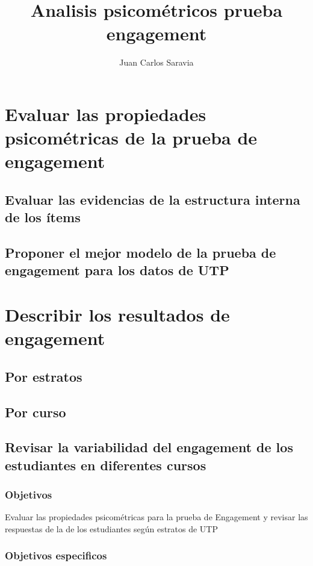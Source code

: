 \documentclass{beamer}
\title{Analisis psicométricos prueba engagement}
\author{Juan Carlos Saravia}
\begin{document}
\begin{frame}
\titlepage
\end{frame}


\section{Evaluar las propiedades psicométricas de la prueba de engagement}
\subsection{Evaluar las evidencias de la estructura interna de los ítems}
\subsection{Proponer el mejor modelo de la prueba de engagement para los datos de UTP}

\section{Describir los resultados de engagement}
\subsection{Por estratos}
\subsection{Por curso}
\subsection{Revisar la variabilidad del engagement de los estudiantes en diferentes cursos}


\begin{frame}
\frametitle{Objetivos}
Evaluar las propiedades psicométricas para la prueba de Engagement y revisar las respuestas de la de los estudiantes según estratos de UTP
\end{frame}



\begin{frame}
\frametitle{Objetivos especificos}
\tableofcontents
\end{frame}
\end{document}
